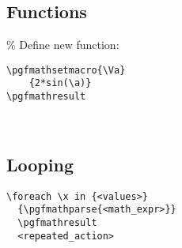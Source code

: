 \subsection*{Functions}
\% Define new function: \\
\begin{minipage}{6.5cm}\begin{lstlisting}
\pgfmathsetmacro{\Va}
    {2*sin(\a)} 
\pgfmathresult
\end{lstlisting}
\end{minipage} \\

\subsection*{Looping}
\begin{minipage}{6.5cm}\begin{lstlisting}
\foreach \x in {<values>} 
  {\pgfmathparse{<math_expr>}}
  \pgfmathresult
  <repeated_action>
\end{lstlisting}
\end{minipage} \\

\ \\


